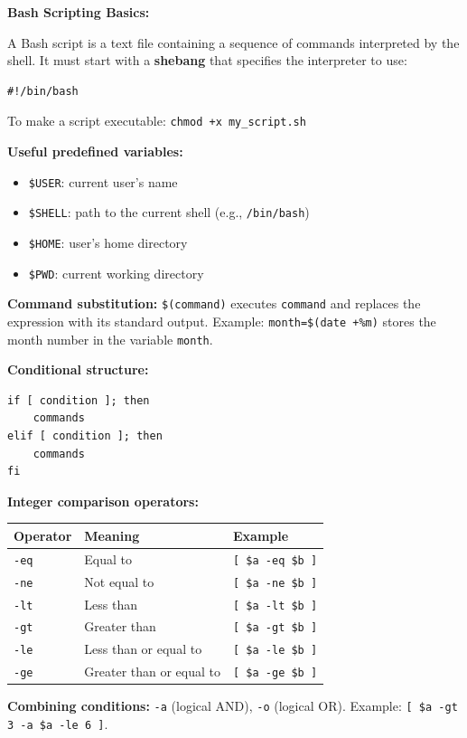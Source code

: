 \documentclass[a4paper,11pt]{article}
\theoremstyle{plain}
\theoremstyle{definition}
\begin{document}
\begin{rappel}
\textbf{Bash Scripting Basics:}

A Bash script is a text file containing a sequence of commands interpreted by the shell. It must start with a \textbf{shebang} that specifies the interpreter to use:
\begin{lstlisting}[numbers=none]
#!/bin/bash
\end{lstlisting}

To make a script executable: \texttt{chmod +x my\_script.sh}

\medskip
\textbf{Useful predefined variables:}
\begin{itemize}
    \item \texttt{\$USER}: current user's name
    \item \texttt{\$SHELL}: path to the current shell (e.g., \texttt{/bin/bash})
    \item \texttt{\$HOME}: user's home directory
    \item \texttt{\$PWD}: current working directory
\end{itemize}

\medskip
\textbf{Command substitution:} \texttt{\$(command)} executes \texttt{command} and replaces the expression with its standard output. Example: \texttt{month=\$(date +\%m)} stores the month number in the variable \texttt{month}.

\medskip
\textbf{Conditional structure:}
\begin{lstlisting}[numbers=none]
if [ condition ]; then
    commands
elif [ condition ]; then
    commands
fi
\end{lstlisting}

\medskip
\textbf{Integer comparison operators:}

\begin{center}
\begin{tabular}{lll}
\toprule
\textbf{Operator} & \textbf{Meaning} & \textbf{Example} \\
\midrule
\texttt{-eq} & Equal to & \texttt{[ \$a -eq \$b ]} \\
\texttt{-ne} & Not equal to & \texttt{[ \$a -ne \$b ]} \\
\texttt{-lt} & Less than & \texttt{[ \$a -lt \$b ]} \\
\texttt{-gt} & Greater than & \texttt{[ \$a -gt \$b ]} \\
\texttt{-le} & Less than or equal to & \texttt{[ \$a -le \$b ]} \\
\texttt{-ge} & Greater than or equal to & \texttt{[ \$a -ge \$b ]} \\
\bottomrule
\end{tabular}
\end{center}

\medskip
\textbf{Combining conditions:} \texttt{-a} (logical AND), \texttt{-o} (logical OR). Example: \texttt{[ \$a -gt 3 -a \$a -le 6 ]}.
\end{rappel}
\end{document}

